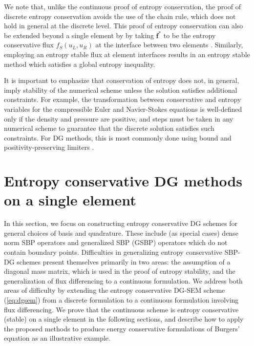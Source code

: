 \documentclass[preprint,10pt]{elsarticle}
\theoremstyle{definition}
\theoremstyle{lemma}
\theoremstyle{theorem}
\theoremstyle{assumption}
\begin{document}
We note that, unlike the continuous proof of entropy conservation, the proof of discrete entropy conservation avoids the use of the chain rule, which does not hold in general at the discrete level.  This proof of entropy conservation can also be extended beyond a single element by by taking $\bm{f}^*$ to be the entropy conservative flux $f_S(u_L,u_R)$ at the interface between two elements \cite{carpenter2014entropy, gassner2017br1, chen2017entropy}.
Similarly, employing an entropy stable flux at element interfaces results in an entropy stable method which satisfies a global entropy inequality.  

It is important to emphasize that conservation of entropy does not, in general, imply stability of the numerical scheme unless the solution satisfies additional constraints.  For example, the transformation between conservative and entropy variables for the compressible Euler and Navier-Stokes equations is well-defined only if the density and pressure are positive, and steps must be taken in any numerical scheme to guarantee that the discrete solution satisfies such constraints.  For DG methods, this is most commonly done using bound and positivity-preserving limiters \cite{zhang2010positivity, zhang2012maximum}.  


\section{Entropy conservative DG methods on a single element}
\label{sec:ecdg}

In this section, we focus on constructing entropy conservative DG schemes for general choices of basis and quadrature.  These include (as special cases) dense norm SBP operators and generalized SBP (GSBP) operators which do not contain boundary points.  Difficulties in generalizing entropy conservative SBP-DG schemes present themselves primarily in two areas: the assumption of a diagonal mass matrix, which is used in the proof of entropy stability, and the generalization of flux differencing to a continuous formulation.  We address both areas of difficulty by extending the entropy conservative DG-SEM scheme (\ref{eq:dgsem}) from a discrete formulation to a continuous formulation involving flux differencing.  We prove that the continuous scheme is entropy conservative (stable) on a single element in the following sections, and describe how to apply the proposed methods to produce energy conservative formulations of Burgers' equation as an illustrative example.  
\end{document}
